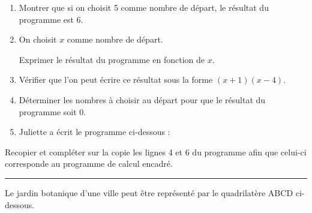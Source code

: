 \documentclass[a4paper,12pt]{article}
\newcommand{\exercicesuite}[2]{%
  \vspace{0.8cm}%
  \noindent\rule{\textwidth}{0.4pt}%
  \vspace{0.4cm}\par%
  \noindent{\Large\bfseries Exercice #1\hspace{0.3em}{\normalfont\normalsize(#2 points)}}%
  \par\vspace{0.7cm}%
}
\begin{document}
\begin{enumerate}[itemsep=4pt]
  \item Montrer que si on choisit 5 comme nombre de départ, le résultat du programme est 6.
  \item On choisit $x$ comme nombre de départ.

  Exprimer le résultat du programme en fonction de $x$.
  \item Vérifier que l'on peut écrire ce résultat sous la forme $(x + 1)(x - 4)$.
  \item Déterminer les nombres à choisir au départ pour que le résultat du programme soit 0.
  \item Juliette a écrit le programme ci-dessous :

\begin{center}
\begin{scratch}
\end{scratch}
\end{center}
\end{enumerate}

\medskip

Recopier et compléter sur la copie les lignes 4 et 6 du programme afin que celui-ci corresponde au programme de calcul encadré.

\exercicesuite{4}{7}

Le jardin botanique d'une ville peut être représenté par le quadrilatère ABCD ci-dessous.

\medskip
\end{document}
